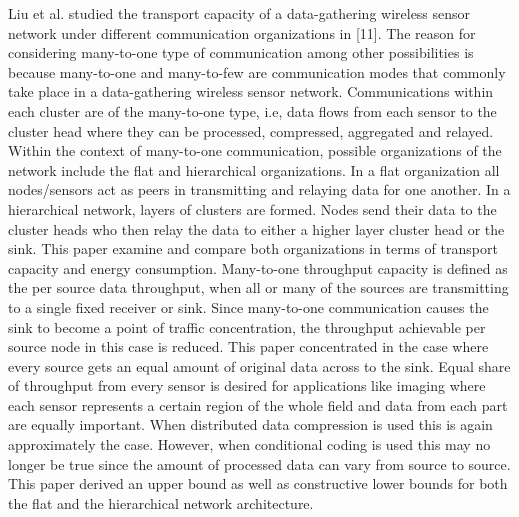 \documentclass[MTech]{iitmdiss}
\begin{document}
Liu et al. studied  the transport capacity of a data-gathering wireless sensor network under different communication organizations in [11]. The reason for considering many-to-one type of
communication among other possibilities is because many-to-one and many-to-few  are communication modes that commonly take place in a data-gathering wireless sensor network. Communications within each cluster are of the many-to-one type, i.e, data flows from each sensor
to the cluster head where they can be processed, compressed, aggregated and relayed. Within the context of many-to-one communication, possible organizations of the network include the flat and hierarchical organizations. In a flat organization all nodes/sensors act as peers in transmitting and relaying data for one another. In a hierarchical network, layers of clusters are formed.
Nodes send their data to the cluster heads who then relay the data to either a higher layer cluster head or the sink. This paper examine and compare both organizations in terms of transport capacity and energy consumption. Many-to-one throughput capacity is defined 
as the per source data throughput, when all or many of the sources are transmitting to a single fixed
receiver or sink. Since many-to-one communication causes the sink to become a point of traffic concentration, the throughput achievable per source node in this case is reduced. This paper concentrated in  the case where every source gets an equal  amount of original data across to the sink. Equal share of throughput from every sensor is desired for applications like imaging where each
sensor represents a certain region of the whole field and data from each part are equally important.
When distributed data compression is used this is again approximately the case. However,
when conditional coding is used this may no longer be true since the amount of processed data
can vary from source to source. This paper derived an upper bound as well as constructive lower bounds for both the flat and the hierarchical network architecture.
\end{document}
